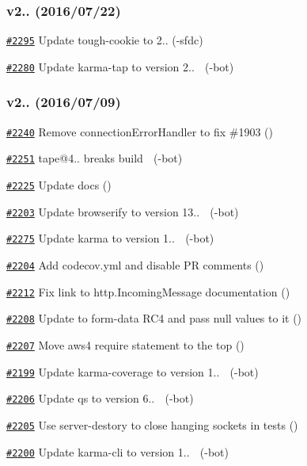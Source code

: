 \subsubsection*{v2.. (2016/07/22)}


\begin{DoxyItemize}
\item \href{https://github.com/request/request/pull/2295}{\tt \#2295} Update tough-\/cookie to 2.. (-\/sfdc)
\item \href{https://github.com/request/request/pull/2280}{\tt \#2280} Update karma-\/tap to version 2.. 🚀 (-\/bot)
\end{DoxyItemize}

\subsubsection*{v2.. (2016/07/09)}


\begin{DoxyItemize}
\item \href{https://github.com/request/request/pull/2240}{\tt \#2240} Remove connection\+Error\+Handler to fix \#1903 ()
\item \href{https://github.com/request/request/pull/2251}{\tt \#2251} tape@4.. breaks build 🚨 (-\/bot)
\item \href{https://github.com/request/request/pull/2225}{\tt \#2225} Update docs ()
\item \href{https://github.com/request/request/pull/2203}{\tt \#2203} Update browserify to version 13.. 🚀 (-\/bot)
\item \href{https://github.com/request/request/pull/2275}{\tt \#2275} Update karma to version 1.. 🚀 (-\/bot)
\item \href{https://github.com/request/request/pull/2204}{\tt \#2204} Add codecov.\+yml and disable PR comments ()
\item \href{https://github.com/request/request/pull/2212}{\tt \#2212} Fix link to http.\+Incoming\+Message documentation ()
\item \href{https://github.com/request/request/pull/2208}{\tt \#2208} Update to form-\/data R\+C4 and pass null values to it ()
\item \href{https://github.com/request/request/pull/2207}{\tt \#2207} Move aws4 require statement to the top ()
\item \href{https://github.com/request/request/pull/2199}{\tt \#2199} Update karma-\/coverage to version 1.. 🚀 (-\/bot)
\item \href{https://github.com/request/request/pull/2206}{\tt \#2206} Update qs to version 6.. 🚀 (-\/bot)
\item \href{https://github.com/request/request/pull/2205}{\tt \#2205} Use server-\/destory to close hanging sockets in tests ()
\item \href{https://github.com/request/request/pull/2200}{\tt \#2200} Update karma-\/cli to version 1.. 🚀 (-\/bot)
\end{DoxyItemize}

